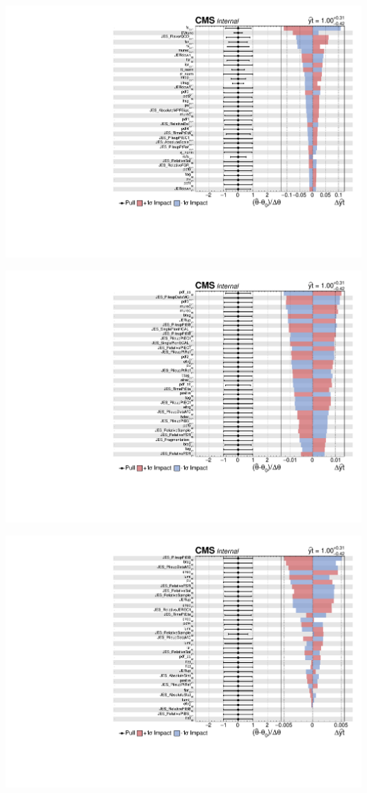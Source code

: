     \centering
    \includegraphics[width=.8\linewidth]{figs/impacts1.pdf}

    \centering
    \includegraphics[width=.8\linewidth]{figs/impacts2.pdf}

    \centering
    \includegraphics[width=.8\linewidth]{figs/impacts3.pdf}



